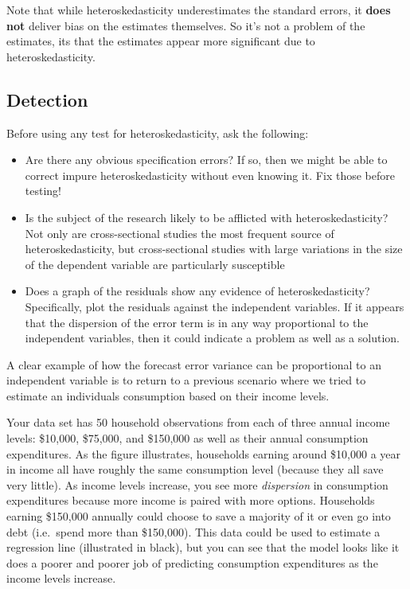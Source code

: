 \documentclass[
]{book}
\begin{document}
Note that while heteroskedasticity underestimates the standard errors, it \textbf{does not} deliver bias on the estimates themselves. So it's not a problem of the estimates, its that the estimates appear more significant due to heteroskedasticity.

\hypertarget{detection}{%
\subsection{Detection}\label{detection}}

Before using any test for heteroskedasticity, ask the following:

\begin{itemize}
\item
  Are there any obvious specification errors? If so, then we might be able to correct impure heteroskedasticity without even knowing it. Fix those before testing!
\item
  Is the subject of the research likely to be afflicted with heteroskedasticity? Not only are cross-sectional studies the most frequent source of heteroskedasticity, but cross-sectional studies with large variations in the size of the dependent variable are particularly susceptible
\item
  Does a graph of the residuals show any evidence of heteroskedasticity? Specifically, plot the residuals against the independent variables. If it appears that the dispersion of the error term is in any way proportional to the independent variables, then it could indicate a problem as well as a solution.
\end{itemize}

A clear example of how the forecast error variance can be proportional to an independent variable is to return to a previous scenario where we tried to estimate an individuals consumption based on their income levels.

Your data set has 50 household observations from each of three annual income levels: \$10,000, \$75,000, and \$150,000 as well as their annual consumption expenditures. As the figure illustrates, households earning around \$10,000 a year in income all have roughly the same consumption level (because they all save very little). As income levels increase, you see more \emph{dispersion} in consumption expenditures because more income is paired with more options. Households earning \$150,000 annually could choose to save a majority of it or even go into debt (i.e.~spend more than \$150,000). This data could be used to estimate a regression line (illustrated in black), but you can see that the model looks like it does a poorer and poorer job of predicting consumption expenditures as the income levels increase.
\end{document}
